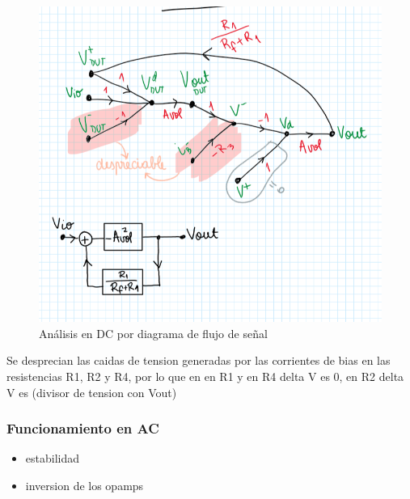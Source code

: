 \documentclass[../../main.tex]{subfiles}
\begin{document}
\begin{figure}[htb]
	\centering
	\includegraphics[scale=1]{imagenes/dc_signal_feedback.png}
	\caption{An\'alisis en DC por diagrama de flujo de se\~nal}
	\label{fig:ej_3_diagrama_flujo_senial}
\end{figure}

Se desprecian las caidas de tension generadas por las corrientes de bias en las resistencias R1, R2 y R4, por lo que en en R1 y en R4 delta V es 0, en R2 delta V es (divisor de tension con Vout)

\subsubsection{Funcionamiento en AC}



\begin{itemize}
	\item estabilidad
	\item inversion de los opamps
\end{itemize}
\end{document}
